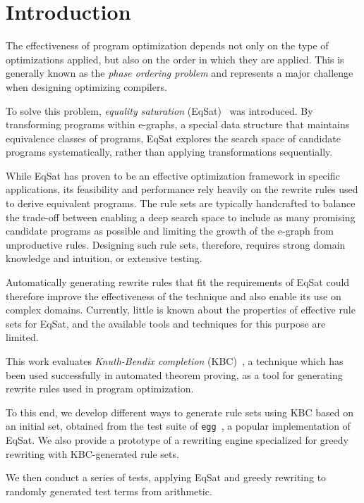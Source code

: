 \chapter{Introduction}
\label{chap:introduction}

The effectiveness of program optimization depends not only on the type of optimizations applied, but also on the order in which they are applied. This is generally known as the \emph{phase ordering problem} and represents a major challenge when designing optimizing compilers. 

To solve this problem, \emph{equality saturation} (EqSat)~\cite{Tate_2011, Willsey_2021} was introduced. By transforming programs within e-graphs, a special data structure that maintains equivalence classes of programs, EqSat explores the search space of candidate programs systematically, rather than applying transformations sequentially.

While EqSat has proven to be an effective optimization framework in specific applications, its feasibility and performance rely heavily on the rewrite rules used to derive equivalent programs. The rule sets are typically handcrafted to balance the trade-off between enabling a deep search space to include as many promising candidate programs as possible and limiting the growth of the e-graph from unproductive rules. Designing such rule sets, therefore, requires strong domain knowledge and intuition, or extensive testing.

Automatically generating rewrite rules that fit the requirements of EqSat could therefore improve the effectiveness of the technique and also enable its use on complex domains. Currently, little is known about the properties of effective rule sets for EqSat, and the available tools and techniques for this purpose are limited.

This work evaluates \emph{Knuth-Bendix completion} (KBC)~\citep{10.1093/comjnl/34.1.2}, a technique which has been used successfully in automated theorem proving, as a tool for generating rewrite rules used in program optimization. 

To this end, we develop different ways to generate rule sets using KBC based on an initial set, obtained from the test suite of \texttt{egg}~\cite{Willsey_2021}, a popular implementation of EqSat. We also provide a prototype of a rewriting engine specialized for greedy rewriting with KBC-generated rule sets.

We then conduct a series of tests, applying EqSat and greedy rewriting to randomly generated test terms from arithmetic.


